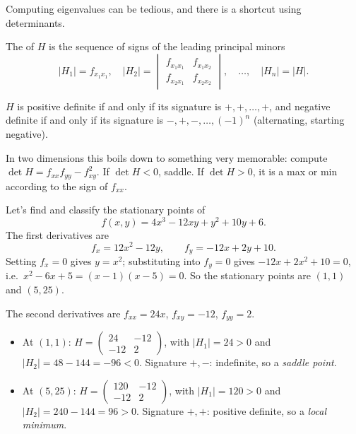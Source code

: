 Computing eigenvalues can be tedious, and there is a shortcut using determinants.

\begin{definition}[Signature]
	The  of $H$ is the sequence of signs of the leading principal minors
	$$
	|H_1| = f_{x_1 x_1}, \quad |H_2| = \begin{vmatrix} f_{x_1x_1} & f_{x_1x_2} \\ f_{x_2x_1} & f_{x_2x_2}\end{vmatrix}, \quad \dots, \quad |H_n| = |H|.
	$$
\end{definition}

\begin{proposition}
	$H$ is positive definite if and only if its signature is $+, +, \dots, +$, and negative definite if and only if its signature is $-, +, -, \dots, (-1)^n$ (alternating, starting negative).
\end{proposition}

In two dimensions this boils down to something very memorable: compute $\det H = f_{xx}f_{yy} - f_{xy}^2$. If $\det H < 0$, saddle. If $\det H > 0$, it is a max or min according to the sign of $f_{xx}$.

\begin{example}
	Let's find and classify the stationary points of
	$$
	f(x, y) = 4x^3 - 12xy + y^2 + 10y + 6.
	$$
	The first derivatives are
	$$
	f_x = 12x^2 - 12y, \qquad f_y = -12x + 2y + 10.
	$$
	Setting $f_x = 0$ gives $y = x^2$; substituting into $f_y = 0$ gives $-12x + 2x^2 + 10 = 0$, i.e.\ $x^2 - 6x + 5 = (x - 1)(x - 5) = 0$. So the stationary points are $(1, 1)$ and $(5, 25)$.

	The second derivatives are $f_{xx} = 24x$, $f_{xy} = -12$, $f_{yy} = 2$.
	\begin{itemize}
		\item At $(1, 1)$: $H = \begin{pmatrix} 24 & -12 \\ -12 & 2 \end{pmatrix}$, with $|H_1| = 24 > 0$ and $|H_2| = 48 - 144 = -96 < 0$. Signature $+, -$: indefinite, so a \emph{saddle point}.
		\item At $(5, 25)$: $H = \begin{pmatrix} 120 & -12 \\ -12 & 2\end{pmatrix}$, with $|H_1| = 120 > 0$ and $|H_2| = 240 - 144 = 96 > 0$. Signature $+, +$: positive definite, so a \emph{local minimum}.
	\end{itemize}
\end{example}

